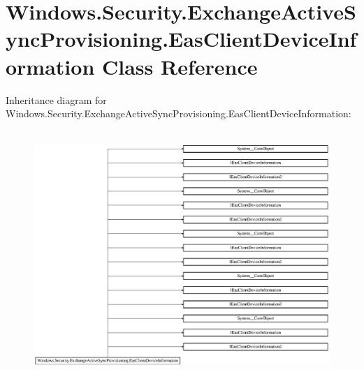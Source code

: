 \hypertarget{class_windows_1_1_security_1_1_exchange_active_sync_provisioning_1_1_eas_client_device_information}{}\section{Windows.\+Security.\+Exchange\+Active\+Sync\+Provisioning.\+Eas\+Client\+Device\+Information Class Reference}
\label{class_windows_1_1_security_1_1_exchange_active_sync_provisioning_1_1_eas_client_device_information}
Inheritance diagram for Windows.\+Security.\+Exchange\+Active\+Sync\+Provisioning.\+Eas\+Client\+Device\+Information\+:\begin{figure}[H]
\begin{center}
\leavevmode
\includegraphics[height=9.431579cm]{class_windows_1_1_security_1_1_exchange_active_sync_provisioning_1_1_eas_client_device_information}
\end{center}
\end{figure}
